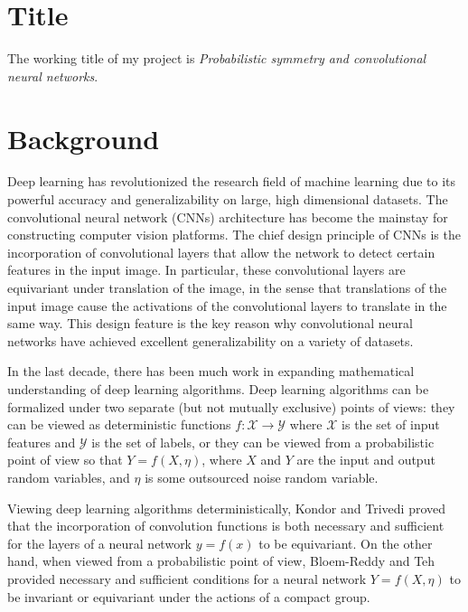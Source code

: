 \documentclass[]{STAT_547C}
\begin{document}
\vspace{-2cm}


\section{Title}

The working title of my project is \emph{Probabilistic symmetry and convolutional neural networks}.  

\section{Background}

Deep learning has revolutionized the research field of machine learning due to its powerful accuracy and generalizability on large, high dimensional datasets.
The convolutional neural network (CNNs) architecture has become the mainstay for constructing computer vision platforms.
The chief design principle of CNNs is the incorporation of convolutional layers that allow the network to detect certain features in the input image.
In particular, these convolutional layers are equivariant under translation of the image, in the sense that translations of the input image cause the activations of the convolutional layers to translate in the same way.
This design feature is the key reason why convolutional neural networks have achieved excellent generalizability on a variety of datasets.

In the last decade, there has been much work in expanding mathematical understanding of deep learning algorithms.
Deep learning algorithms can be formalized under two separate (but not mutually exclusive) points of views: they can be viewed as deterministic functions $f: \mathcal{X} \to \mathcal{Y}$ where $\mathcal{X}$ is the set of input features and $\mathcal{Y}$ is the set of labels, or they can be viewed from a probabilistic point of view so that $Y = f(X, \eta)$, where $X$ and $Y$ are the input and output random variables, and $\eta$ is some outsourced noise random variable.

Viewing deep learning algorithms deterministically, Kondor and Trivedi \cite{kondor2018generalization} proved that the incorporation of convolution functions is both necessary and sufficient for the layers of a neural network $y = f(x)$ to be equivariant.
On the other hand, when viewed from a probabilistic point of view, Bloem-Reddy and Teh \cite{bloemreddy2019probabilistic} provided necessary and sufficient conditions for a neural network $Y = f(X, \eta)$ to be invariant or equivariant under the actions of a compact group.
\end{document}
